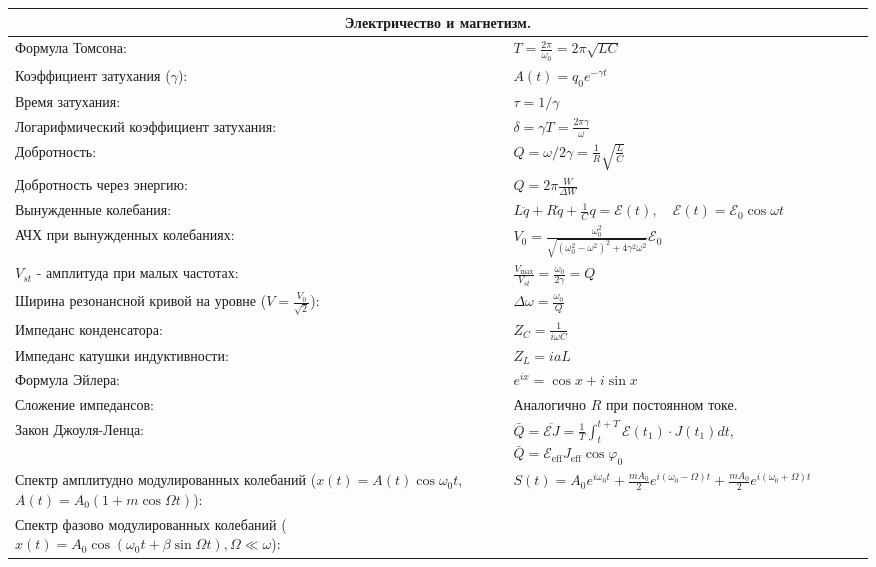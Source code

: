 \documentclass{article}
\begin{document}
\begin{tabular}{ |p{6cm}|p{3cm}|p{6cm}|p{3.5cm}|  }
\hline
\multicolumn{4}{|c|}{Электричество и магнетизм.} \\
\hline
Формула Томсона: &
$T=\frac{2 \pi}{\omega_{0}}=2 \pi \sqrt{L C}$&
&
\\
\hline
Коэффициент затухания ($\gamma$):&
$A(t)=q_{0} e^{-\gamma t}$ &
&
\\
\hline
Время затухания: &
$\tau=1 / \gamma$ &
&
\\
\hline
Логарифмический коэффициент затухания: &
$\delta=\gamma T=\frac{2 \pi \gamma}{\omega}$&
&
\\
\hline
Добротность: &
$Q=\omega / 2 \gamma = \frac{1}{R} \sqrt{\frac{L}{C}}$ &
&
\\
\hline
Добротность через энергию: &
$Q=2 \pi \frac{W}{\Delta W}$ &
&
\\
\hline
Вынужденные колебания: &
$L \ddot{q}+R \dot{q}+\frac{1}{C} q=\mathcal{E}(t), \quad \mathcal{E}(t)=\mathcal{E}_{0} \cos \omega t$&
&
\\
\hline
АЧХ при вынужденных колебаниях: &
$V_{0}=\frac{\omega_{0}^{2}}{\sqrt{\left(\omega_{0}^{2}-\omega^{2}\right)^{2}+4 \gamma^{2} \omega^{2}}} \mathcal{E}_{0}$&
&
\\
\hline
$V_{st}$ - амплитуда при малых частотах: &
$\frac{V_{\max }}{V_{st}}=\frac{\omega_{0}}{2 \gamma}=Q$&
&
\\
\hline
Ширина резонансной кривой на уровне ($V = \frac{V_0}{\sqrt{2}}$): &
$\Delta \omega=\frac{\omega_{0}}{Q}$&
&
\\
\hline
Импеданс конденсатора:&
$Z_C = \frac{1}{i \omega C}$&
&
\\
\hline
Импеданс катушки индуктивности:&
$Z_L = i a L$&
&
\\
\hline
Формула Эйлера: &
$e^{i x}=\cos x+i \sin x$&
&
\\
\hline
Сложение импедансов:&
Аналогично $R$ при постоянном токе.&
&
\\
\hline
Закон Джоуля-Ленца: &
$\bar{Q}=\overline{\mathcal{E} J}=\frac{1}{T} \int_{t}^{t+T} \mathcal{E}\left(t_{1}\right) \cdot J\left(t_{1}\right) d t$,
$\bar{Q}=\mathcal{E}_{\mathrm{eff}} J_{\mathrm{eff}} \cos \varphi_{0}$&
&
\\
\hline
Спектр амплитудно модулированных колебаний ($x(t)=A(t) \cos \omega_{0} t$, $A(t)=A_{0}(1+m \cos \Omega t)$):&
$S(t)=A_{0} e^{i \omega_{0} t}+\frac{m A_{0}}{2} e^{i\left(\omega_{0}-\Omega\right) t}+\frac{m A_{0}}{2} e^{i\left(\omega_{0}+\Omega\right) t}$&
&
\\
\hline
Спектр фазово модулированных колебаний ($x(t)=A_{0} \cos \left(\omega_{0} t+\beta \sin \Omega t\right), \Omega \ll \omega$):&

\end{tabular}
\end{document}
